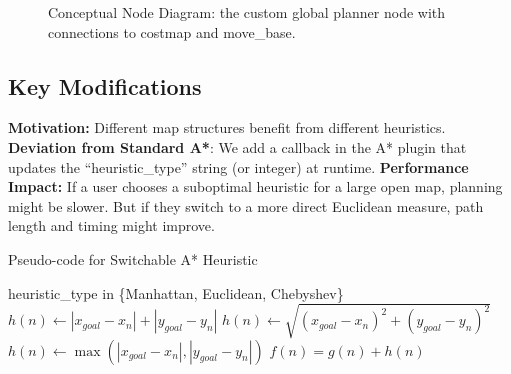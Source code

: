 \documentclass[letterpaper, 10 pt, conference]{ieeeconf}
\begin{document}
\begin{figure}[!ht]
    \centering
    \caption{Conceptual Node Diagram: the custom global planner node 
    with connections to costmap and move\_base.}
    \label{fig:rqt_graph}
\end{figure}

\subsection{Key Modifications}
\textbf{Motivation:} 
Different map structures benefit from different heuristics.  
\textbf{Deviation from Standard A*}: 
We add a callback in the A* plugin that updates the “heuristic\_type” string 
(or integer) at runtime.  
\textbf{Performance Impact:} 
If a user chooses a suboptimal heuristic for a large open map, planning might 
be slower. But if they switch to a more direct Euclidean measure, path length 
and timing might improve.

\begin{algorithm}[H]
\caption{Pseudo-code for Switchable A* Heuristic}
\label{alg:alg2}
\begin{algorithmic}[1]
\REQUIRE heuristic\_type in \{Manhattan, Euclidean, Chebyshev\}
    \STATE $h(n) \leftarrow |x_{goal} - x_n| + |y_{goal} - y_n|$
    \STATE $h(n) \leftarrow \sqrt{(x_{goal}-x_n)^2 + (y_{goal}-y_n)^2}$
    \STATE $h(n) \leftarrow \max(|x_{goal}-x_n|,|y_{goal}-y_n|)$
\ENDIF
\RETURN $f(n) = g(n) + h(n)$
\end{algorithmic}
\end{algorithm}


\end{document}
